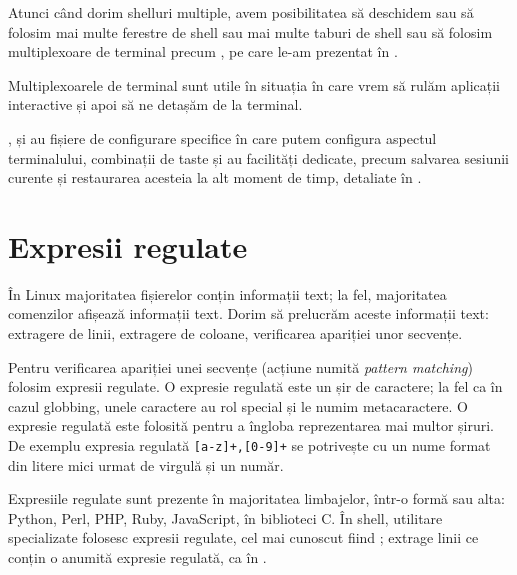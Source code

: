 Atunci când dorim shelluri multiple, avem posibilitatea să deschidem sau să folosim mai multe ferestre de shell sau mai multe taburi de shell sau să folosim multiplexoare de terminal precum ,  pe care le-am prezentat în .

Multiplexoarele de terminal sunt utile în situația în care vrem să rulăm aplicații interactive și apoi să ne detașăm de la terminal.

,  și  au fișiere de configurare specifice în care putem configura aspectul terminalului, combinații de taste și au facilități dedicate, precum salvarea sesiunii curente și restaurarea acesteia la alt moment de timp, detaliate în .

\section{Expresii regulate}
\label{sec:cli:regex}

În Linux majoritatea fișierelor conțin informații text;
la fel, majoritatea comenzilor afișează informații text.
Dorim să prelucrăm aceste informații text: extragere de linii, extragere de coloane, verificarea apariției unor secvențe.

Pentru verificarea apariției unei secvențe (acțiune numită \textit{pattern matching}) folosim expresii regulate.
O expresie regulată este un șir de caractere;
la fel ca în cazul globbing, unele caractere au rol special și le numim metacaractere.
O expresie regulată este folosită pentru a îngloba reprezentarea mai multor șiruri.
De exemplu expresia regulată \verb|[a-z]+,[0-9]+| se potrivește cu un nume format din litere mici urmat de virgulă și un număr.

Expresiile regulate sunt prezente în majoritatea limbajelor, într-o formă sau alta: Python, Perl, PHP, Ruby, JavaScript, în biblioteci C.
În shell, utilitare specializate folosesc expresii regulate, cel mai cunoscut fiind ;
 extrage linii ce conțin o anumită expresie regulată, ca în .

